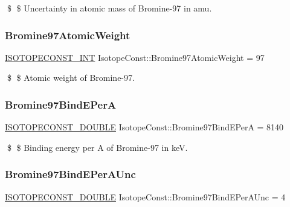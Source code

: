 \$ \$ Uncertainty in atomic mass of Bromine-\/97 in amu. \mbox{\label{group___isotope_const-_bromine-_br97_ga4f35e98183cc28f7e3f99f2aa4cc3824}} 
\subsubsection{\texorpdfstring{Bromine97\+Atomic\+Weight}{Bromine97AtomicWeight}}
{\footnotesize\ttfamily \mbox{\hyperlink{group___isotope_const-_macros_ga5f18360b3e99483a35c32d789e62621c}{I\+S\+O\+T\+O\+P\+E\+C\+O\+N\+S\+T\+\_\+\+I\+NT}} Isotope\+Const\+::\+Bromine97\+Atomic\+Weight = 97}

\$ \$ Atomic weight of Bromine-\/97. \mbox{\label{group___isotope_const-_bromine-_br97_gae482b1161e0450d1d697bfaec1c71f32}} 
\subsubsection{\texorpdfstring{Bromine97\+Bind\+E\+PerA}{Bromine97BindEPerA}}
{\footnotesize\ttfamily \mbox{\hyperlink{group___isotope_const-_macros_ga8f45a7272ce02c0b4c65c44636ed719a}{I\+S\+O\+T\+O\+P\+E\+C\+O\+N\+S\+T\+\_\+\+D\+O\+U\+B\+LE}} Isotope\+Const\+::\+Bromine97\+Bind\+E\+PerA = 8140}

\$ \$ Binding energy per A of Bromine-\/97 in keV. \mbox{\label{group___isotope_const-_bromine-_br97_ga3a2fb3e9caa25b0b6f672fe7536e0c86}} 
\subsubsection{\texorpdfstring{Bromine97\+Bind\+E\+Per\+A\+Unc}{Bromine97BindEPerAUnc}}
{\footnotesize\ttfamily \mbox{\hyperlink{group___isotope_const-_macros_ga8f45a7272ce02c0b4c65c44636ed719a}{I\+S\+O\+T\+O\+P\+E\+C\+O\+N\+S\+T\+\_\+\+D\+O\+U\+B\+LE}} Isotope\+Const\+::\+Bromine97\+Bind\+E\+Per\+A\+Unc = 4}

